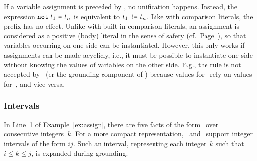 \begin{Note}
If a variable assignment is preceded by , 
no unification happens.
Instead, the expression $\texttt{not}~t_1~\texttt{=}~t_n$ is equivalent to $t_1~\texttt{!=}~t_n$.
Like with comparison literals, the prefix  has no effect.
Unlike with built-in comparison literals,
an assignment is considered as
a positive (body) literal in the sense of safety (cf.\ Page~\pageref{pg:safe}),
so that variables occurring on one side can be instantiated.
However, this only works if assignments
can be made acyclicly, i.e.,
it must be possible to instantiate one side
without knowing the values of variables on
the other side.
E.g., the rule 
is not accepted by \gringo\ (or the grounding component of \clingo)
because values for~ rely on values for~, and vice versa.
%
%
\end{Note}

\subsubsection{Intervals}\label{subsec:gringo:interval}

In Line~1 of Example~\ref{ex:assign},
there are five facts of the form~
over consecutive integers~$k$.
For a more compact representation,
\gringo\ and \clingo\ support integer intervals of the form $i$$j$.
Such an interval, representing each integer~$k$ such that $i\leq k\leq j$,
is expanded during grounding.


